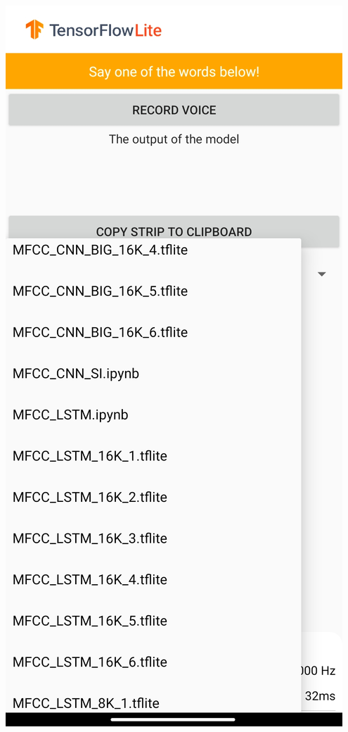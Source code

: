\documentclass{report}
\theoremstyle{definition}
\theoremstyle{remark}
\begin{document}
\begin{minipage}{\textwidth}
\begin{minipage}{.5\textwidth}
    \label{fig:theApp}
\end{minipage}
\begin{minipage}{.5\textwidth}
    \centering
    \includegraphics[scale=0.1]{img/app_2.jpg}
    \label{fig:theAppWDropdown}
\end{minipage}
\end{minipage}
\end{document}
